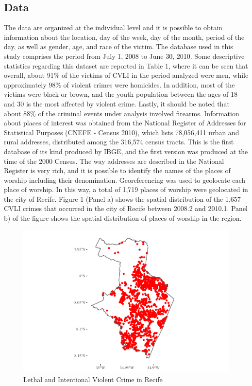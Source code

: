 \documentclass[smallextended]{svjour3}       %
\begin{document}
\hypertarget{data}{%
\subsection{Data}\label{data}}

The data are organized at the individual level and it is possible to
obtain information about the location, day of the week, day of the
month, period of the day, as well as gender, age, and race of the
victim. The database used in this study comprises the period from July
1, 2008 to June 30, 2010. Some descriptive statistics regarding this
dataset are reported in Table 1, where it can be seen that overall,
about 91\% of the victims of CVLI in the period analyzed were men, while
approximately 98\% of violent crimes were homicides. In addition, most
of the victims were black or brown, and the youth population between the
ages of 18 and 30 is the most affected by violent crime. Lastly, it
should be noted that about 88\% of the criminal events under analysis
involved firearms. Information about places of interest was obtained
from the National Register of Addresses for Statistical Purposes (CNEFE
- Census 2010), which lists 78,056,411 urban and rural addresses,
distributed among the 316,574 census tracts. This is the first database
of its kind produced by IBGE, and the first version was produced at the
time of the 2000 Census. The way addresses are described in the National
Register is very rich, and it is possible to identify the names of the
places of worship including their denomination. Georeferencing was used
to geolocate each place of worship. In this way, a total of 1,719 places
of worship were geolocated in the city of Recife. Figure 1 (Panel a)
shows the spatial distribution of the 1,657 CVLI crimes that occurred in
the city of Recife between 2008.2 and 2010.1. Panel b) of the figure
shows the spatial distribution of places of worship in the region.

\begin{figure}

\includegraphics{Moral_Communities_and_Crime_v1_files/figure-latex/plot-crime-1} \hfill{}

\caption{\label{fig:plot-crime}Lethal and Intentional Violent Crime in Recife}\label{fig:plot-crime}
\end{figure}
\end{document}
